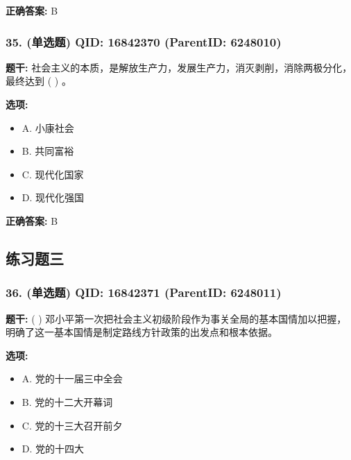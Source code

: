 \documentclass[12pt,UTF8]{ctexart}
\begin{document}
\textbf{正确答案:}
B

\vspace{0.3em}\hrulefill\vspace{0.7em}

\subsubsection*{35. (单选题) \small QID: 16842370 (ParentID: 6248010)}

\textbf{题干:}
社会主义的本质，是解放生产力，发展生产力，消灭剥削，消除两极分化，最终达到 ( ) 。



\textbf{选项:}
\begin{itemize}[leftmargin=*]

  \item A. 小康社会

  \item B. 共同富裕

  \item C. 现代化国家

  \item D. 现代化强国

\end{itemize}

\textbf{正确答案:}
B

\vspace{0.3em}\hrulefill\vspace{0.7em}

\subsection*{练习题三}

\subsubsection*{36. (单选题) \small QID: 16842371 (ParentID: 6248011)}

\textbf{题干:}
( ) 邓小平第一次把社会主义初级阶段作为事关全局的基本国情加以把握，明确了这一基本国情是制定路线方针政策的出发点和根本依据。



\textbf{选项:}
\begin{itemize}[leftmargin=*]

  \item A. 党的十一届三中全会

  \item B. 党的十二大开幕词

  \item C. 党的十三大召开前夕

  \item D. 党的十四大

\end{itemize}
\end{document}
